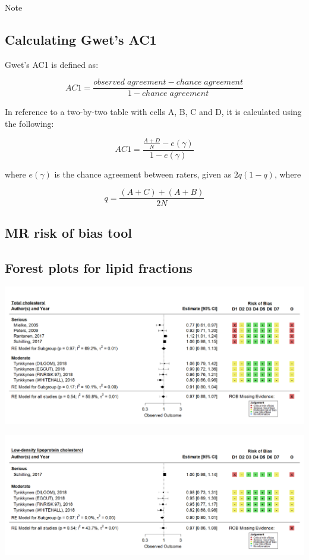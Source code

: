 \documentclass[a4paper, twoside]{templates/ociamthesis}
\begin{document}
Note

\hypertarget{calculating-gwets-ac1}{%
\subsection{Calculating Gwet's AC1}\label{calculating-gwets-ac1}}

Gwet's AC1 is defined as:

\[AC1 = \frac{observed\;agreement-chance\;agreement}{1-chance\;agreement}\]

In reference to a two-by-two table with cells A, B, C and D, it is calculated using the following:

\begin{equation}
  AC1 = \frac{\frac{A+D}{N}-e(\gamma)}{1-e(\gamma)}
  \label{eq:AC1-main}
\end{equation}

where \(e(\gamma)\) is the chance agreement between raters, given as \(2q(1-q)\), where

\begin{equation}
  q = \frac{(A+C)+(A+B)}{2N}
  \label{eq:AC1-supp}
\end{equation}

\hypertarget{appendix-mr-rob}{%
\subsection{MR risk of bias tool}\label{appendix-mr-rob}}

\hypertarget{lipid-fraction-forest-plots}{%
\subsection{Forest plots for lipid fractions}\label{lipid-fraction-forest-plots}}

\includegraphics[width=1\linewidth]{figures/sys-rev/fp_obs_Dementia_TC_}

\includegraphics[width=1\linewidth]{figures/sys-rev/fp_obs_Dementia_LDL_}
\end{document}
